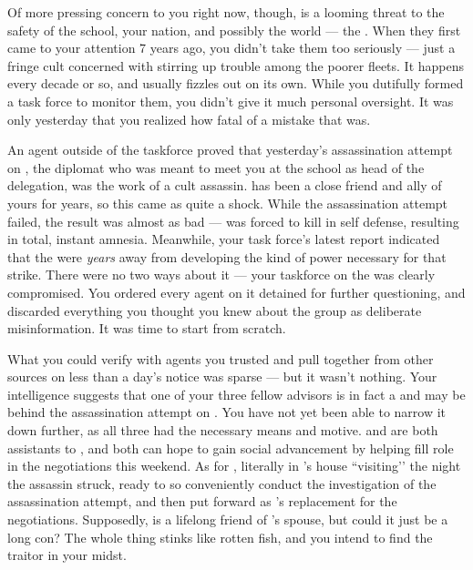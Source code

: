 \documentclass[char]{GL2020}
\begin{document}
Of more pressing concern to you right now, though, is a looming threat to the safety of the school, your nation, and possibly the world — the \pGoaties{}. When they first came to your attention 7 years ago, you didn't take them too seriously — just a fringe cult concerned with stirring up trouble among the poorer \pShippie{} fleets. It happens every decade or so, and usually fizzles out on its own. While you dutifully formed a task force to monitor them, you didn't give it much personal oversight. It was only yesterday that you realized how fatal of a mistake that was. 

An agent outside of the taskforce proved that yesterday's assassination attempt on \cHeadDiplomat{\full}, the diplomat who was meant to meet you at the school as head of the \pShip{} delegation, was the work of a cult assassin. \cHeadDiplomat{} has been a close friend and ally of yours for years, so this came as quite a shock. While the assassination attempt failed, the result was almost as bad — \cHeadDiplomat{} was forced to kill in self defense, resulting in total, instant amnesia. Meanwhile, your task force's latest report indicated that the \pGoaties{} were \emph{years} away from developing the kind of power necessary for that strike. There were no two ways about it — your taskforce on the \pGoaties{} was clearly compromised. You ordered every agent on it detained for further questioning, and discarded everything you thought you knew about the group as deliberate misinformation. It was time to start from scratch.

What you could verify with agents you trusted and pull together from other sources on less than a day's notice was sparse — but it wasn't nothing. Your intelligence suggests that one of your three fellow \pShip{} advisors is in fact a \pGoatie{} and may be behind the assassination attempt on \cHeadDiplomat{}. You have not yet been able to narrow it down further, as all three had the necessary means and motive. \cChupLeader{\intro} and \cJuniorStatesman{\intro} are both assistants to \cHeadDiplomat{}, and both can hope to gain social advancement by helping fill \cHeadDiplomat{\their} role in the negotiations this weekend. As for \cEbbPriest{\intro}, \cEbbPriest{\theywere} literally in \cHeadDiplomat{}’s house ``visiting’’ the night the assassin struck, ready to so conveniently conduct the investigation of the assassination attempt, and then put \cEbbPriest{\themself} forward as \cHeadDiplomat{}'s replacement for the negotiations. Supposedly, \cEbbPriest{} is a lifelong friend of \cHeadDiplomat{}'s spouse, but could it just be a long con? The whole thing stinks like rotten fish, and you intend to find the traitor in your midst.
\end{document}
